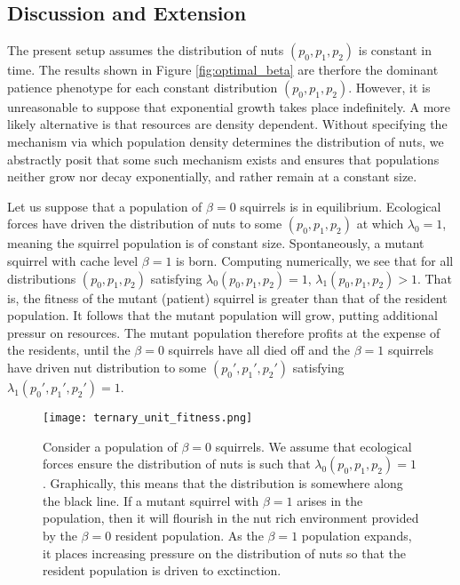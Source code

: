 \documentclass[titlepage, hidelinks, 12pt]{article}
\theoremstyle{plain}
\theoremstyle{remark}
\theoremstyle{definition}
\begin{document}
\subsection{Discussion and Extension}
The present setup assumes the distribution of nuts $(p_0, p_1, p_2)$ is constant in time. The results shown in Figure \ref{fig:optimal_beta}
are therfore the dominant patience phenotype for each constant distribution $(p_0, p_1, p_2).$ However, it is unreasonable to suppose that
exponential growth takes place indefinitely. 
A more likely alternative is that resources
are density dependent. Without specifying the mechanism via which population density determines the distribution of nuts, we abstractly
posit that some such mechanism exists and ensures that populations neither grow nor decay exponentially, and rather remain at a constant size.


Let us suppose that a population of $\beta = 0$ squirrels is in equilibrium. 
Ecological forces have driven the distribution of nuts to some $(p_0, p_1, p_2)$ at which $\lambda_0 =1$,
meaning the squirrel population is of constant size. Spontaneously, a mutant squirrel with cache level $\beta = 1$ is born. Computing numerically,
we see that for all distributions $(p_0,p_1,p_2)$ satisfying $\lambda_0(p_0, p_1, p_2) = 1$, $\lambda_1(p_0,p_1,p_2)>1$. That is, the fitness
of the mutant (patient) squirrel is greater than that of the resident population. It follows that the mutant population will grow, putting additional
pressur on resources. The mutant population therefore profits at the expense of the residents, until the $\beta = 0$ squirrels have all died off
and the $\beta = 1$ squirrels have driven nut distribution to some $(p_0', p_1', p_2')$ satisfying $\lambda_1(p_0', p_1', p_2') = 1$. 

\begin{figure}[H]
    \centering
    \texttt{[image: ternary\_unit\_fitness.png]}
    \caption{Consider a population of $\beta = 0$ squirrels. We assume that ecological forces ensure the distribution of nuts is such
    that $\lambda_0(p_0, p_1, p_2) = 1$. Graphically, this means that the distribution is somewhere along the black line. If a mutant
squirrel with $\beta = 1$ arises in the population, then it will flourish in the nut rich environment provided by the $\beta = 0$ resident
population. As the $\beta = 1$ population expands, it places increasing pressure on the distribution of nuts so that the resident population
is driven to exctinction. }
    \label{fig:unit_fitness}
\end{figure}
\end{document}

